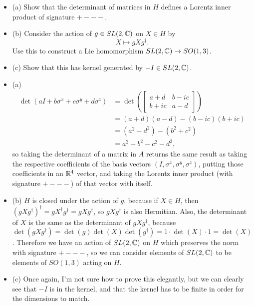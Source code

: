 \documentclass{article}
\begin{document}
\bigskip
\begin{prob}
    \begin{itemize}
        \item (a) Show that the determinant of matrices in $H$ defines a Lorentz inner product of signature $+---$.
        \item (b) Consider the action of $g \in SL(2,\mathbb{C})$ on $X\in H$ by
            \[ X \mapsto gXg^\dag. \]
            Use this to construct a Lie homomorphism $SL(2,\mathbb{C}) \rightarrow SO(1,3)$.
        \item (c) Show that this has kernel generated by $-I \in SL(2,\mathbb{C})$.
    \end{itemize}
\end{prob}
\begin{itemize}
    \item (a)
        \begin{align*}
            \det \left( aI+b\sigma^x+c\sigma^y+d\sigma^z \right) &= \det \left( \begin{bmatrix}
                    a+d & b-ic \\
                    b+ic & a-d
            \end{bmatrix} \right) \\
                                                                 &= (a+d)(a-d)-(b-ic)(b+ic) \\
                                                                 &= (a^2-d^2)-(b^2+c^2) \\
                                                                 &= a^2 - b^2 - c^2 - d^2,
        \end{align*}
        so taking the determinant of a matrix in $A$ returns the same result as taking the respective coefficients of the basis vectors $(I, \sigma^x, \sigma^y, \sigma^z)$, putting those coefficients in an $\mathbb{R}^4$ vector, and taking the Lorentz inner product (with signature $+---$) of that vector with itself.
    \item (b) $H$ is closed under the action of $g$, because if $X \in H$, then $(gXg^\dag)^\dag = gX^\dag g^\dag = gXg^\dag$, so $gXg^\dag$ is also Hermitian. Also, the determinant of $X$ is the same as the determinant of $gXg^\dag$, because $\det(gXg^\dag)=\det(g)\det(X)\det(g^\dag)=1\cdot \det(X) \cdot 1 = \det(X)$. Therefore we have an action of $SL(2,\mathbb{C})$ on $H$ which preserves the norm with signature $+---$, so we can consider elements of $SL(2,\mathbb{C})$ to be elements of $SO(1,3)$ acting on $H$.
    \item (c) Once again, I'm not sure how to prove this elegantly, but we can clearly see that $-I$ is in the kernel, and that the kernel has to be finite in order for the dimensions to match.
\end{itemize}
\end{document}
